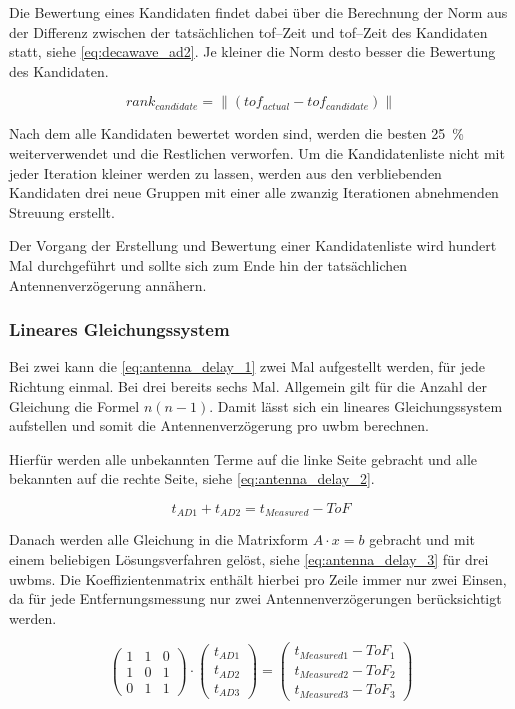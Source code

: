 Die Bewertung eines Kandidaten findet dabei über die Berechnung der Norm aus der Differenz zwischen der tatsächlichen \Gls{tof}--Zeit und \Gls{tof}--Zeit des Kandidaten statt, siehe \autoref{eq:decawave_ad2}. Je kleiner die Norm desto besser die Bewertung des Kandidaten.

\begin{equation}
rank_{candidate}=\lVert (tof_{actual} - tof_{candidate}) \lVert\label{eq:decawave_ad2}
\end{equation}

Nach dem alle Kandidaten bewertet worden sind, werden die besten \SI{25}{\percent} weiterverwendet und die Restlichen verworfen. Um die Kandidatenliste nicht mit jeder Iteration kleiner werden zu lassen, werden aus den verbliebenden Kandidaten drei neue Gruppen mit einer alle zwanzig Iterationen abnehmenden Streuung erstellt.

Der Vorgang der Erstellung und Bewertung einer Kandidatenliste wird hundert Mal durchgeführt und sollte sich zum Ende hin der tatsächlichen Antennenverzögerung annähern.


\begin{comment}
--------------------------------------------------------------------------------
\end{comment}
\subsubsection{Lineares Gleichungssystem}

Bei zwei  kann die \autoref{eq:antenna_delay_1} zwei Mal aufgestellt werden, für jede Richtung einmal. Bei drei  bereits sechs Mal. Allgemein gilt für die Anzahl der Gleichung die Formel $n(n-1)$. Damit lässt sich ein lineares Gleichungssystem aufstellen und somit die Antennenverzögerung pro \Gls{uwbm} berechnen.

Hierfür werden alle unbekannten Terme auf die linke Seite gebracht und alle bekannten auf die rechte Seite, siehe \autoref{eq:antenna_delay_2}.

\begin{equation}
t_{AD1}+t_{AD2}=t_{Measured}-ToF\label{eq:antenna_delay_2}
\end{equation}

Danach werden alle Gleichung in die Matrixform $A\cdot x=b$ gebracht und mit einem beliebigen Lösungsverfahren gelöst, siehe \autoref{eq:antenna_delay_3} für drei \Glspl{uwbm}. Die Koeffizientenmatrix enthält hierbei pro Zeile immer nur zwei Einsen, da für jede Entfernungsmessung nur zwei Antennenverzögerungen berücksichtigt werden.

\begin{equation}
\begin{pmatrix}1&1&0\\1&0&1\\0&1&1\end{pmatrix} \cdot \begin{pmatrix}t_{AD1}\\t_{AD2}\\t_{AD3}\end{pmatrix} = \begin{pmatrix}t_{Measured1}-ToF_{1}\\t_{Measured2}-ToF_{2}\\t_{Measured3}-ToF_{3}\end{pmatrix} \label{eq:antenna_delay_3}
\end{equation}

